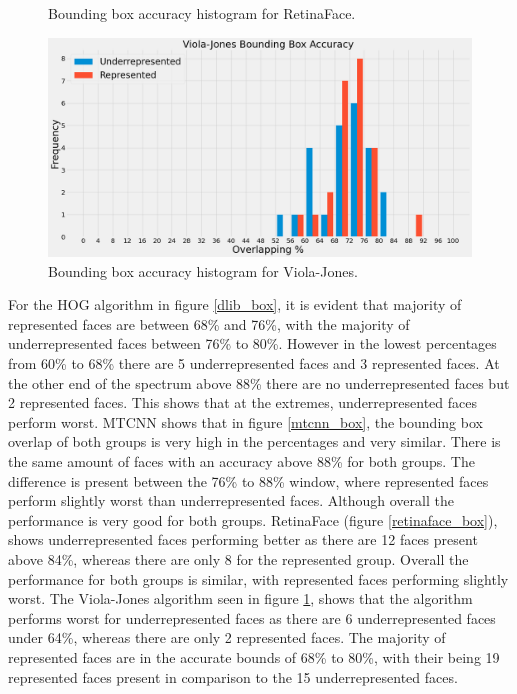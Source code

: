 \documentclass{l4proj}
\begin{document}
\begin{figure}[h!]
\begin{minipage}{0.49\textwidth}
    \caption{Bounding box accuracy histogram for RetinaFace.}
    \label{retinaface_box}
  \end{minipage}
    \hfill
  \begin{minipage}{0.49\textwidth}
    \includegraphics[width=\textwidth]{images/viola_box.png}
    \caption{Bounding box accuracy histogram for Viola-Jones.}
    \label{viola_box}
  \end{minipage} 
 
\end{figure}

For the HOG algorithm in figure \ref{dlib_box}, it is evident that majority of represented faces are between 68\% and 76\%, with the majority of underrepresented faces between 76\% to 80\%. However in the lowest percentages from 60\% to 68\% there are 5 underrepresented faces and 3 represented faces. At the other end of the spectrum above 88\% there are no underrepresented faces but 2 represented faces. This shows that at the extremes, underrepresented faces perform worst. MTCNN shows that in figure \ref{mtcnn_box}, the bounding box overlap of both groups is very high in the percentages and very similar. There is the same amount of faces with an accuracy above 88\% for both groups. The difference is present between the 76\% to 88\% window, where represented faces perform slightly worst than underrepresented faces. Although overall the performance is very good for both groups. RetinaFace (figure \ref{retinaface_box}), shows underrepresented faces performing better as there are 12 faces present above 84\%, whereas there are only 8 for the represented group. Overall the performance for both groups is similar, with represented faces performing slightly worst. The Viola-Jones algorithm seen in figure \ref{viola_box}, shows that the algorithm performs worst for underrepresented faces as there are 6 underrepresented faces under 64\%, whereas there are only 2 represented faces. The majority of represented faces are in the accurate bounds of 68\% to 80\%, with their being 19 represented faces present in comparison to the 15 underrepresented faces.
\end{document}
